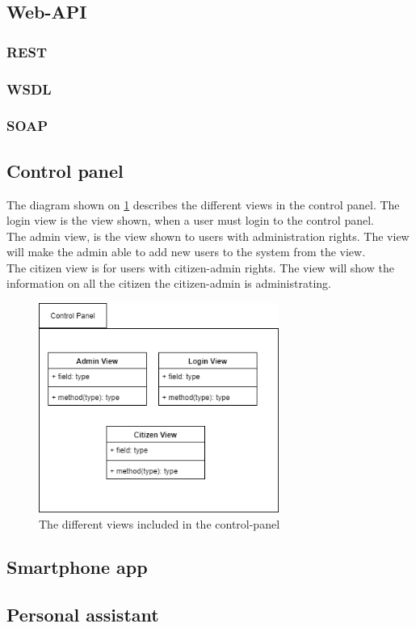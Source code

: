 \subsection{Web-API}

\subsubsection{REST}

\subsubsection{WSDL}

\subsubsection{SOAP}


\subsection{Control panel}
The diagram shown on \ref{fig:controlpanel} describes the different views in the control panel. The login view is the view shown, when a user must login to the control panel.\\
The admin view, is the view shown to users with administration rights. The view will make the admin able to add new users to the system from the view.\\
The citizen view is for users with citizen-admin rights. The view will show the information on all the citizen the citizen-admin is administrating.

\begin{figure}[H]
    \centering
    \includegraphics[width=0.7\textwidth]{Figures/ControlPanel.png}
    \caption{The different views included in the control-panel}
    \label{fig:controlpanel}
\end{figure}

\subsection{Smartphone app}

\subsection{Personal assistant}